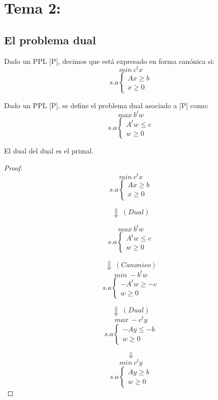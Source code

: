 \documentclass[11pt,fleqn]{book} %
\begin{document}
\part{Tema 2:}
\chapter{El problema dual}
\begin{definition}
  Dado un PPL [P], decimos que está expresado en forma canónica  si:
  $$
  min ~ c^t x
  $$
  $$s.a \left\{
  \begin{array}{c}
	Ax\geq b \\
	x \geq 0
  \end{array}
  \right.
  $$
\end{definition}


\begin{definition}
  Dado un PPL [P], se define el problema dual asociado a [P] como:
  $$
  max ~ b^t w
  $$
  $$s.a \left\{
  \begin{array}{c}
	A^t  w \leq c \\
	w \geq 0
  \end{array}
  \right.
  $$
\end{definition}

\begin{proposition}
  El dual del dual es el primal.
\end{proposition}
\begin{proof}
  $$
  min ~ c^t x
  $$
  $$s.a \left\{
  \begin{array}{c}
    Ax\geq b \\
    x \geq 0
  \end{array}
  \right.
  $$

  $$ \Downarrow ~ (Dual)$$

  $$
  max ~ b^t w
  $$
  $$s.a \left\{
  \begin{array}{c}
    A^t  w \leq c \\
    w \geq 0
  \end{array}
  \right.
  $$

  $$ \Downarrow ~ (Canonico) $$
  $$
  min ~ - b^t w
  $$
  $$s.a \left\{
  \begin{array}{c}
    -A^t  w \geq -c \\
    w \geq 0
  \end{array}
  \right.
  $$

  $$ \Downarrow ~ (Dual) $$
  $$
  max ~ -c^t y
  $$
  $$s.a \left\{
  \begin{array}{c}
    -A  y \leq -b \\
    w \geq 0
  \end{array}
  \right.
  $$

  $$ \Downarrow $$
  $$
  min ~ c^t y
  $$
  $$s.a \left\{
  \begin{array}{c}
    A  y \geq b \\
    w \geq 0
  \end{array}
  \right.
  $$
\end{proof}
\end{document}
